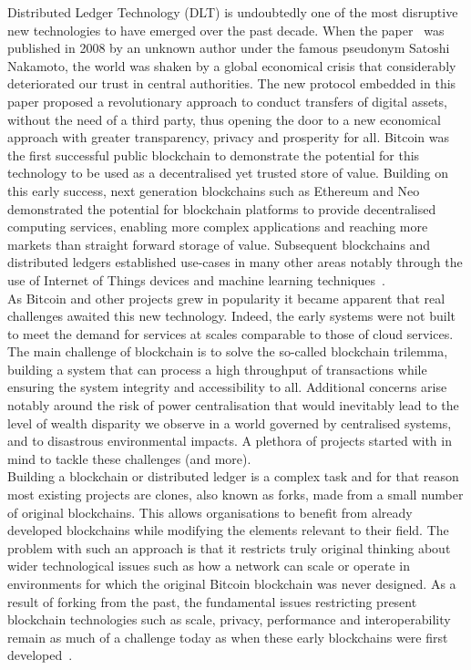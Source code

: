 Distributed Ledger Technology (DLT) is undoubtedly one of the most disruptive new  technologies to have emerged over the past decade. When the paper~\cite{nakamoto} was published in 2008 by an unknown author under the famous pseudonym Satoshi Nakamoto, the world was shaken by a global economical crisis that considerably deteriorated our trust in central authorities. The new protocol embedded in this paper proposed a revolutionary approach to conduct transfers of digital assets, without the need of a third party, thus opening the door to a new economical approach with greater transparency, privacy and prosperity for all. Bitcoin was the first successful public blockchain to demonstrate the potential for this technology to be used as a decentralised yet trusted store of value. Building on this early success, next generation blockchains such as Ethereum and Neo demonstrated the potential for blockchain platforms to provide decentralised computing services, enabling more complex applications and reaching more markets than straight forward storage of value. Subsequent blockchains and distributed ledgers established use-cases in many other areas notably through the use of Internet of Things devices and machine learning techniques~\cite{govuk}.\\

As Bitcoin and other projects grew in popularity it became apparent that real challenges awaited this new technology. Indeed, the early systems were not built to meet the demand for services at scales comparable to those of cloud services. The main challenge of blockchain is to solve the so-called blockchain trilemma, building a system that can process a high throughput of transactions while ensuring the system integrity and accessibility to all. Additional concerns arise notably around the risk of power centralisation that would inevitably lead to the level of wealth disparity we observe in a world governed by centralised systems, and to disastrous environmental impacts. A plethora of projects started with in mind to tackle these challenges (and more).\\

Building a blockchain or distributed ledger is a complex task and for that reason most existing projects are clones, also known as forks, made from a small number of original blockchains. This allows organisations to benefit from already developed blockchains while modifying the elements relevant to their field. The problem with such an approach is that it restricts truly original thinking about wider technological issues such as how a network can scale or operate in environments for which the original Bitcoin blockchain was never designed. As a result of forking from the past, the fundamental issues restricting present blockchain technologies such as scale, privacy, performance and interoperability remain as much of a challenge today as when these early blockchains were first developed~\cite{obst}.\\

